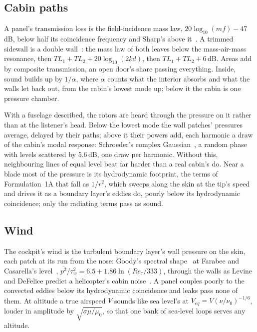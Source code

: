 \documentclass[10pt,a4paper,twocolumn]{article}
\begin{document}
\subsection{Cabin paths}
A panel's transmission loss is the field-incidence mass law, $20\log_{10}(mf)-47$\,dB, below half its coincidence frequency and Sharp's above it~\cite{sharp}. A trimmed sidewall is a double wall~\cite{fahy}: the mass law of both leaves below the mass-air-mass resonance, then $TL_1+TL_2+20\log_{10}(2kd)$, then $TL_1+TL_2+6$\,dB. Areas add by composite transmission, an open door's share passing everything. Inside, sound builds up by $1/\alpha$, where $\alpha$ counts what the interior absorbs and what the walls let back out, from the cabin's lowest mode up; below it the cabin is one pressure chamber.

With a fuselage described, the rotors are heard through the pressure on it rather than at the listener's head. Below the lowest mode the wall patches' pressures average, delayed by their paths; above it their powers add, each harmonic a draw of the cabin's modal response: Schroeder's complex Gaussian~\cite{schroeder}, a random phase with levels scattered by 5.6\,dB, one draw per harmonic. Without this, neighbouring lines of equal level beat far harder than a real cabin's do. Near a blade most of the pressure is its hydrodynamic footprint, the terms of Formulation~1A that fall as $1/r^2$, which sweeps along the skin at the tip's speed and drives it as a boundary layer's eddies do, poorly below its hydrodynamic coincidence; only the radiating terms pass as sound.

\subsection{Wind}
The cockpit's wind is the turbulent boundary layer's wall pressure on the skin, each patch at its run from the nose: Goody's spectral shape~\cite{goody} at Farabee and Casarella's level~\cite{farabee}, $\overline{p^2}/\tau_w^2=6.5+1.86\ln(Re_\tau/333)$, through the walls as Levine and DeFelice predict a helicopter's cabin noise~\cite{levine}. A panel couples poorly to the convected eddies below its hydrodynamic coincidence and leaks pass none of them. At altitude a true airspeed $V$ sounds like sea level's at $V_{eq}=V(\nu/\nu_0)^{-1/6}$, louder in amplitude by $\sqrt{\sigma\mu/\mu_0}$, so that one bank of sea-level loops serves any altitude.
\end{document}

